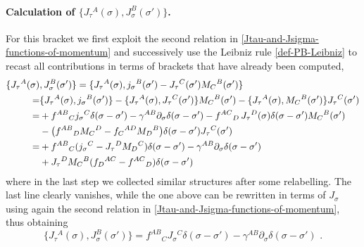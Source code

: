 \documentclass[12pt]{article}
\numberwithin{equation}{section}
\begin{document}
\paragraph{Calculation of $\{ J_{\tau}{}^{A}(\sigma),J_{\sigma}^{B}(\sigma') \}$.} For this bracket we first exploit the second relation in \eqref{Jtau-and-Jsigma-functions-of-momentum} and successively use the Leibniz rule \eqref{def-PB-Leibniz} to recast all contributions in terms of brackets that have already been computed,
\begin{align}
\{ J_{\tau}{}^{A}(\sigma)&,J_{\sigma}^{B}(\sigma') \}=\{ J_{\tau}{}^{A}(\sigma), j_{\sigma}{}^{B}(\sigma')-J_{\tau}{}^{C}(\sigma')M_{C}{}^{B}(\sigma') \}
\\
=& \{ J_{\tau}{}^{A}(\sigma),j_{\sigma}{}^{B}(\sigma') \} - \{J_{\tau}{}^{A}(\sigma),J_{\tau}{}^{C}(\sigma')\}M_{C}{}^{B}(\sigma') - \{J_{\tau}{}^{A}(\sigma),M_{C}{}^{B}(\sigma')\}J_{\tau}{}^{C}(\sigma')
\notag\\
=& +f^{AB}{}_{C}j_{\sigma}{}^{C}\delta(\sigma-\sigma')-\gamma^{AB}\partial_{\sigma}\delta(\sigma-\sigma')-f^{AC}{}_{D} \, J_{\tau}{}^{D}(\sigma)\delta(\sigma-\sigma')M_{C}{}^{B}(\sigma')
\notag\\
&-\bigl(f^{AB}{}_{D}M_{C}{}^{D}-f_{C}{}^{AD}M_{D}{}^{B}\bigr)\delta(\sigma-\sigma')J_{\tau}{}^{C}(\sigma')
\notag\\
=&+f^{AB}{}_{C}(j_{\sigma}{}^{C}-J_{\tau}{}^{D}M_{D}{}^{C})\delta(\sigma-\sigma')-\gamma^{AB}\partial_{\sigma}\delta(\sigma-\sigma')
\notag\\
&+J_{\tau}{}^{D}M_{C}{}^{B}(f_{D}{}^{AC}-f^{AC}{}_{D})\delta(\sigma-\sigma') \,\, 
\notag
\end{align}
where in the last step we collected similar structures after some relabelling. The last line clearly vanishes, while the one above can be rewritten in terms of $J_{\sigma}$ using again the second relation in \eqref{Jtau-and-Jsigma-functions-of-momentum}, thus obtaining
\begin{equation}\label{YB-Jtau-Jsigma-bracket}
\{ J_{\tau}{}^{A}(\sigma),J_{\sigma}^{B}(\sigma') \}=f^{AB}{}_{C}J_{\sigma}{}^{C}\delta(\sigma-\sigma')-\gamma^{AB}\partial_{\sigma}\delta(\sigma-\sigma') \,\, .
\end{equation}
\end{document}
